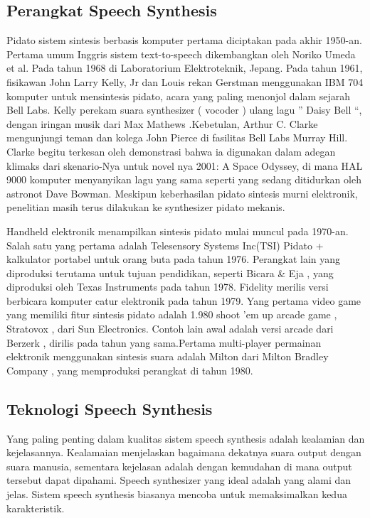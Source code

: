\subsection{Perangkat Speech Synthesis}
Pidato sistem sintesis berbasis komputer pertama diciptakan pada akhir 1950-an. Pertama umum Inggris sistem text-to-speech dikembangkan oleh Noriko Umeda et al. Pada tahun 1968 di Laboratorium Elektroteknik, Jepang. Pada tahun 1961, fisikawan John Larry Kelly, Jr dan Louis rekan Gerstman menggunakan IBM 704 komputer untuk mensintesis pidato, acara yang paling menonjol dalam sejarah Bell Labs. Kelly perekam suara synthesizer ( vocoder ) ulang lagu ” Daisy Bell “, dengan iringan musik dari Max Mathews .Kebetulan, Arthur C. Clarke mengunjungi teman dan kolega John Pierce di fasilitas Bell Labs Murray Hill. Clarke begitu terkesan oleh demonstrasi bahwa ia digunakan dalam adegan klimaks dari skenario-Nya untuk novel nya 2001: A Space Odyssey, di mana HAL 9000 komputer menyanyikan lagu yang sama seperti yang sedang ditidurkan oleh astronot Dave Bowman. Meskipun keberhasilan pidato sintesis murni elektronik, penelitian masih terus dilakukan ke synthesizer pidato mekanis.

Handheld elektronik menampilkan sintesis pidato mulai muncul pada 1970-an. Salah satu yang pertama adalah Telesensory Systems Inc(TSI) Pidato + kalkulator portabel untuk orang buta pada tahun 1976. Perangkat lain yang diproduksi terutama untuk tujuan pendidikan, seperti Bicara \& Eja , yang diproduksi oleh Texas Instruments pada tahun 1978. Fidelity merilis versi berbicara komputer catur elektronik pada tahun 1979. Yang pertama video game yang memiliki fitur sintesis pidato adalah 1.980 shoot ’em up arcade game , Stratovox , dari Sun Electronics. Contoh lain awal adalah versi arcade dari Berzerk , dirilis pada tahun yang sama.Pertama multi-player permainan elektronik menggunakan sintesis suara adalah Milton dari Milton Bradley Company , yang memproduksi perangkat di tahun 1980.

\subsection{Teknologi Speech Synthesis}
Yang paling penting dalam kualitas sistem speech synthesis adalah kealamian dan kejelasannya. Kealamaian menjelaskan bagaimana dekatnya suara output dengan suara manusia, sementara kejelasan adalah dengan kemudahan di mana output tersebut dapat dipahami. Speech synthesizer yang ideal adalah yang alami dan jelas. Sistem speech synthesis biasanya mencoba untuk memaksimalkan kedua karakteristik.

